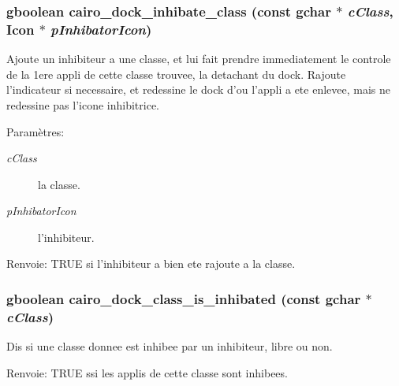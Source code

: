 \subsubsection{\setlength{\rightskip}{0pt plus 5cm}gboolean cairo\_\-dock\_\-inhibate\_\-class (const gchar $\ast$ {\em cClass}, {\bf Icon} $\ast$ {\em pInhibatorIcon})}\label{cairo-dock-class-manager_8h_d0c60072537aa926ce98c16bc3902cd9}


Ajoute un inhibiteur a une classe, et lui fait prendre immediatement le controle de la 1ere appli de cette classe trouvee, la detachant du dock. Rajoute l'indicateur si necessaire, et redessine le dock d'ou l'appli a ete enlevee, mais ne redessine pas l'icone inhibitrice. \begin{Desc}
\item[Paramètres:]
\begin{description}
\item[{\em cClass}]la classe. \item[{\em pInhibatorIcon}]l'inhibiteur. \end{description}
\end{Desc}
\begin{Desc}
\item[Renvoie:]TRUE si l'inhibiteur a bien ete rajoute a la classe. \end{Desc}
\subsubsection{\setlength{\rightskip}{0pt plus 5cm}gboolean cairo\_\-dock\_\-class\_\-is\_\-inhibated (const gchar $\ast$ {\em cClass})}\label{cairo-dock-class-manager_8h_944f3ac8847780cba5e06f2e0c20955f}


Dis si une classe donnee est inhibee par un inhibiteur, libre ou non. \begin{Desc}
\item[Renvoie:]TRUE ssi les applis de cette classe sont inhibees. \end{Desc}
